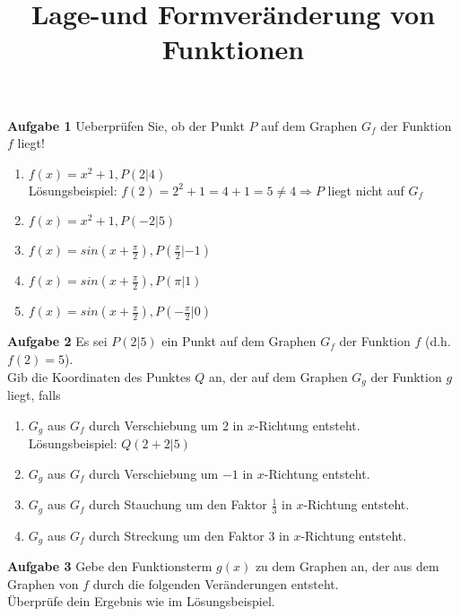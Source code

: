 \documentclass[11pt]{article}
\title{ Lage-und Formver\"anderung von Funktionen }
\begin{document}
\maketitle

\textbf{Aufgabe 1} Ueberpr\"ufen Sie, ob der Punkt $P$ auf dem Graphen $G_f$ der Funktion $f$ liegt!
\begin{enumerate}[label=(\alph*)]
\item $f(x)=x^2+1, P(2|4)$ \\
L\"osungsbeispiel: $f(2) = 2^2+1=4+1=5 \neq 4 \Rightarrow P$ liegt nicht auf $G_f$ 
\item $f(x)=x^2+1, P(-2|5)$ 
\item $f(x)=sin\left( x + \frac{\pi}{2} \right), P\left( \frac{\pi}{2} | -1 \right)$
\item $f(x)=sin\left( x + \frac{\pi}{2} \right), P\left( \pi | 1 \right)$
\item $f(x)=sin\left( x + \frac{\pi}{2} \right), P\left( -\frac{\pi}{2} | 0 \right)$
\end{enumerate}

\textbf{Aufgabe 2} Es sei $P(2|5)$ ein Punkt auf dem Graphen $G_f$ der Funktion $f$ (d.h. $f(2)=5$). \\
Gib die Koordinaten des Punktes $Q$ an, der auf dem Graphen $G_g$ der Funktion $g$ liegt, falls
\begin{enumerate}[label=(\alph*)]
\item $G_g$ aus $G_f$ durch Verschiebung um $2$ in $x$-Richtung entsteht. \\
L\"osungsbeispiel: $Q(2+2|5)$
\item $G_g$ aus $G_f$ durch Verschiebung um $-1$ in $x$-Richtung entsteht.
\item $G_g$ aus $G_f$ durch Stauchung um den Faktor $\frac{1}{3}$ in $x$-Richtung entsteht. 
\item $G_g$ aus $G_f$ durch Streckung um den Faktor $3$ in $x$-Richtung entsteht.
\end{enumerate}

\textbf{Aufgabe 3} Gebe den Funktionsterm $g(x)$ zu dem Graphen an, der aus dem Graphen von $f$ durch die folgenden Ver\"anderungen entsteht. \\
\"Uberpr\"ufe dein Ergebnis wie im L\"osungsbeispiel.
\end{document}
